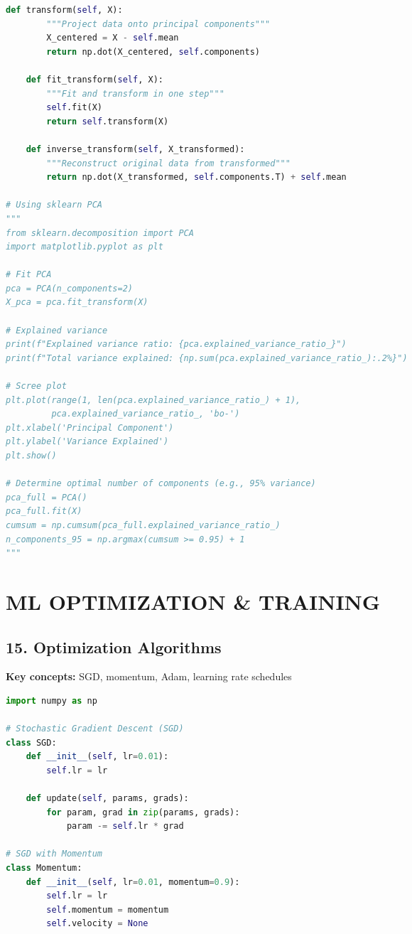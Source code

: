 \documentclass[8pt,landscape]{article}
\begin{document}
\begin{multicols}{3}
\begin{lstlisting}[language=Python]
    def transform(self, X):
        """Project data onto principal components"""
        X_centered = X - self.mean
        return np.dot(X_centered, self.components)

    def fit_transform(self, X):
        """Fit and transform in one step"""
        self.fit(X)
        return self.transform(X)

    def inverse_transform(self, X_transformed):
        """Reconstruct original data from transformed"""
        return np.dot(X_transformed, self.components.T) + self.mean

# Using sklearn PCA
"""
from sklearn.decomposition import PCA
import matplotlib.pyplot as plt

# Fit PCA
pca = PCA(n_components=2)
X_pca = pca.fit_transform(X)

# Explained variance
print(f"Explained variance ratio: {pca.explained_variance_ratio_}")
print(f"Total variance explained: {np.sum(pca.explained_variance_ratio_):.2%}")

# Scree plot
plt.plot(range(1, len(pca.explained_variance_ratio_) + 1),
         pca.explained_variance_ratio_, 'bo-')
plt.xlabel('Principal Component')
plt.ylabel('Variance Explained')
plt.show()

# Determine optimal number of components (e.g., 95% variance)
pca_full = PCA()
pca_full.fit(X)
cumsum = np.cumsum(pca_full.explained_variance_ratio_)
n_components_95 = np.argmax(cumsum >= 0.95) + 1
"""
\end{lstlisting}

\section*{ML OPTIMIZATION \& TRAINING}

\subsection*{15. Optimization Algorithms}
\textbf{Key concepts:} SGD, momentum, Adam, learning rate schedules
\begin{lstlisting}[language=Python]
import numpy as np

# Stochastic Gradient Descent (SGD)
class SGD:
    def __init__(self, lr=0.01):
        self.lr = lr

    def update(self, params, grads):
        for param, grad in zip(params, grads):
            param -= self.lr * grad

# SGD with Momentum
class Momentum:
    def __init__(self, lr=0.01, momentum=0.9):
        self.lr = lr
        self.momentum = momentum
        self.velocity = None


\end{lstlisting}
\end{multicols}
\end{document}
